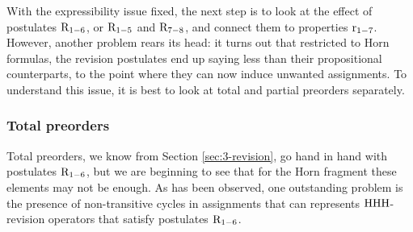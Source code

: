 


With the expressibility issue fixed, the next step is to 
look at the effect of postulates $\mathrm{R}_{1-6}$, or $\mathrm{R}_{1-5}$ and $\mathrm{R}_{7-8}$,
and connect them to properties $\mathrm{r}_{1-7}$.
However, another problem rears its head:
it turns out that restricted to Horn formulas, 
the revision postulates 
end up saying less than their propositional counterparts,
to the point where they can now induce
unwanted assignments. 
To understand this issue, it is best to 
look at total and partial preorders separately.

\subsubsection{Total preorders}
Total preorders, we know from Section \ref{sec:3-revision},
go hand in hand with postulates $\mathrm{R}_{1-6}$, but we are 
beginning to see that for the Horn fragment these elements 
may not be enough.
As has been observed, one outstanding problem is the 
presence of non-transitive cycles in assignments 
that can represents ${\mathrm{HHH}}$-revision operators
that satisfy postulates $\mathrm{R}_{1-6}$.

